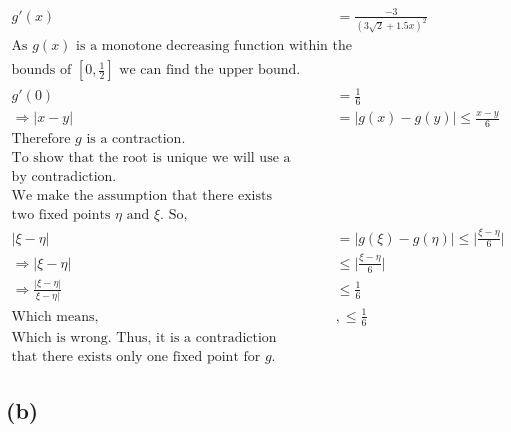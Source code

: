 \documentclass{article}
\begin{document}
\begin{align*}
    g'(x) &= \frac{-3}{(3\sqrt{2}+1.5x)^2}\\
    \text{As $g(x)$ is a monotone decreasing function within the}&\\
    \text{bounds of $\left[0, \frac{1}{2}\right]$ we can find the upper bound.}&\\
    g'(0)&= \frac{1}{6}\\
    \Rightarrow |x-y|&= |g(x)-g(y)| \le \frac{x-y}{6}\\
    \text{Therefore $g$ is a contraction.}&\\
    \text{To show that the root is unique we will use a proof}&\\
    \text{by contradiction.}&\\
    \text{We make the assumption that there exists}&\\
    \text{two fixed points $\eta$ and $\xi$. So,}&\\
    |\xi - \eta|&= |g(\xi)-g(\eta)|\le \bigg | \frac{\xi - \eta}{6}\bigg |\\
    \Rightarrow |\xi - \eta|& \le \bigg | \frac{\xi - \eta}{6}\bigg |\\
    \Rightarrow \frac{| \xi - \eta|}{\xi - \eta|}& \le \frac{1}{6}\\
    \text{Which means, }&, \le \frac{1}{6}\\
    \text{Which is wrong. Thus, it is a contradiction meaning}&\\
    \text{that there exists only one fixed point for $g$.}
\end{align*}

\vspace{10mm}
\subsection*{(b)}
\end{document}
